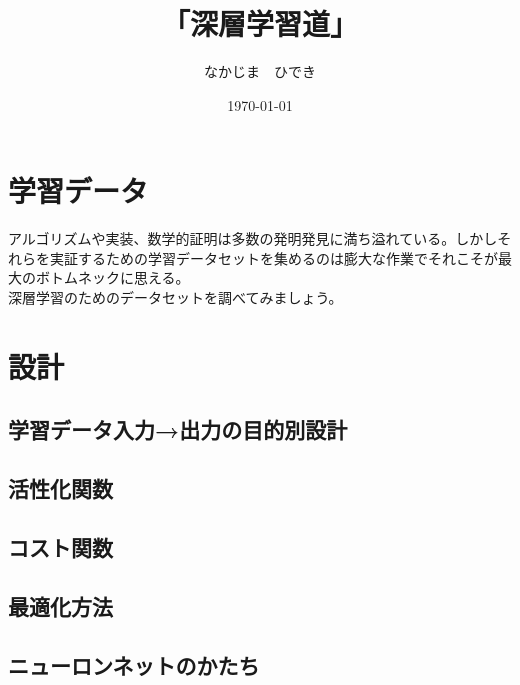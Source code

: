\documentclass[11pt,a4paper]{jsarticle}
\title{「深層学習道」}
\author{なかじま　ひでき}
\date{\today}
\begin{document}
\maketitle
\section{学習データ}
アルゴリズムや実装、数学的証明は多数の発明発見に満ち溢れている。しかしそれらを実証するための学習データセットを集めるのは膨大な作業でそれこそが最大のボトムネックに思える。\\
深層学習のためのデータセットを調べてみましょう。\\
\section{設計}
\subsection{学習データ入力→出力の目的別設計}
\subsection{活性化関数}
\subsection{コスト関数}
\subsection{最適化方法}
\subsection{ニューロンネットのかたち}
\end{document}
